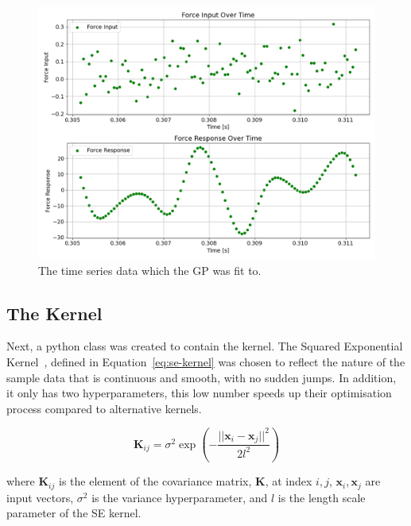 \documentclass[12pt]{article}
\begin{document}
    \begin{figure}[ht]
        \centering
        \includegraphics[width=1.0\linewidth]{figures/input-response-plot/input-response-plot.png}
        \caption{The time series data which the GP was fit to.}
        \label{fig:input-response-plot}
    \end{figure}



    \subsection{The Kernel}
    Next, a python class was created to contain the kernel.
    The Squared Exponential Kernel~\cite{duvenaud2014kernel}, defined in Equation~\ref{eq:se-kernel} was chosen to reflect the nature of the sample data that is continuous and smooth, with no sudden jumps.
    In addition, it only has two hyperparameters, this low number speeds up their optimisation process compared to alternative kernels.

    \begin{equation}
        \mathbf{K}_{ij} = \sigma^2 \exp\left(-\frac{||\mathbf{x}_i - \mathbf{x}_j||^2}{2l^2}\right) \label{eq:se-kernel}
    \end{equation}

    where $\mathbf{K}_{ij}$ is the element of the covariance matrix, $\mathbf{K}$, at index $i, j$, $\mathbf{x}_i, \mathbf{x}_j$ are input vectors, $\sigma^2$ is the variance hyperparameter, and $l$ is the length scale parameter of the SE kernel.
\end{document}
